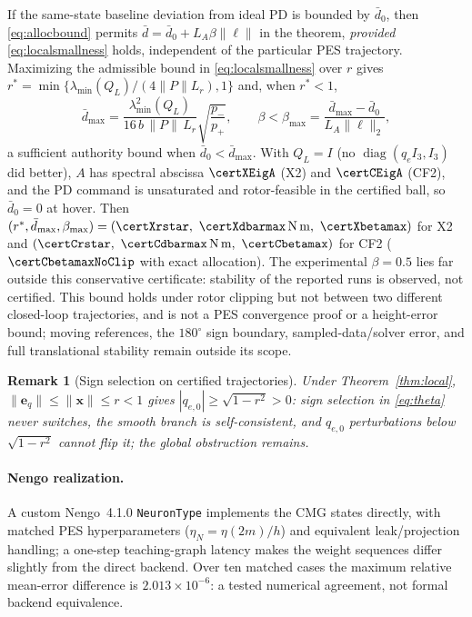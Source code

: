 \documentclass[letterpaper, 10 pt, conference]{ieeeconf}
\newtheorem{remark}{Remark}
\begin{document}
If the same-state baseline deviation from ideal PD is bounded by $\bar d_0$,
then \eqref{eq:allocbound} permits
$\bar d=\bar d_0+L_A\beta\|\bm\ell\|$ in the theorem, \emph{provided}
\eqref{eq:localsmallness} holds, independent of the particular PES
trajectory. Maximizing the admissible bound in
\eqref{eq:localsmallness} over $r$ gives
$r^*=\min\{\lambda_{\min}(Q_L)/(4\|P\|L_r),1\}$ and, when $r^*<1$,
\begin{equation}
 \bar d_{\max}=\frac{\lambda_{\min}^2(Q_L)}{16\,b\,\|P\|\,L_r}
 \sqrt{\frac{p_-}{p_+}},\qquad
 \beta<\beta_{\max}=\frac{\bar d_{\max}-\bar d_0}{L_A\|\bm\ell\|_2},
 \label{eq:betamax}
\end{equation}
a sufficient authority bound when $\bar d_0<\bar d_{\max}$. With $Q_L=I$
(no $\operatorname{diag}(q_eI_3,I_3)$ did better), $A$ has spectral abscissa
$\certXEigA$ (X2) and $\certCEigA$ (CF2), and the PD command is unsaturated
and rotor-feasible in the certified ball, so $\bar d_0=0$ at hover. Then
$(r^*,\bar d_{\max},\beta_{\max})=(\certXrstar,\ \certXdbarmax\,\mathrm{N\,m},\
\certXbetamax)$ for X2 and $(\certCrstar,\ \certCdbarmax\,\mathrm{N\,m},\
\certCbetamax)$ for CF2 ($\certCbetamaxNoClip$ with exact allocation). The
experimental $\beta=0.5$ lies far outside this conservative certificate:
stability of the reported runs is observed, not certified. This bound
holds under rotor clipping but not between two different closed-loop
trajectories, and is not a PES convergence proof or a height-error bound;
moving references, the $180^\circ$ sign boundary, sampled-data/solver
error, and full translational stability remain outside its scope.

\begin{remark}[Sign selection on certified trajectories]
Under Theorem~\ref{thm:local}, $\|\bm e_q\|\le\|\bm x\|\le r<1$ gives
$|q_{e,0}|\ge\sqrt{1-r^2}>0$: sign selection in \eqref{eq:theta} never
switches, the smooth branch is self-consistent, and $q_{e,0}$ perturbations
below $\sqrt{1-r^2}$ cannot flip it; the global obstruction
\cite{bhat2000topological} remains.
\end{remark}

\paragraph{Nengo realization.}
A custom Nengo~4.1.0 \texttt{NeuronType} implements the CMG states directly, with matched PES hyperparameters ($\eta_N=\eta(2m)/h$) and equivalent leak/projection handling; a one-step teaching-graph latency makes the weight sequences differ slightly from the direct backend. Over ten matched cases the maximum relative mean-error difference is $2.013\times10^{-6}$: a tested numerical agreement, not formal backend equivalence.
\end{document}
